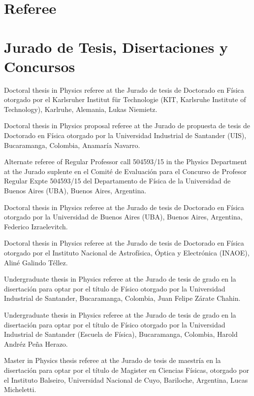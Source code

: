 

\ifeng
  \section*{Referee}
\else
  \section*{Jurado de Tesis, Disertaciones y Concursos}
\fi

\ifeng
Doctoral thesis in Physics referee at the 
\else
Jurado de tesis de Doctorado en Física otorgado por el 
\fi
Karlsruher Institut für Technologie (KIT, Karlsruhe Institute of Technology), Karlruhe, Alemania, Lukas Niemietz. 

\ifeng
Doctoral thesis in Physics proposal referee at the 
\else
Jurado de propuesta de tesis de Doctorado en Física otorgado por la 
\fi
Universidad Industrial de Santander (UIS), Bucaramanga, Colombia, Anamaría Navarro.

\ifeng
Alternate referee of Regular Professor call 504593/15 in the Physics Department at the  
\else
Jurado suplente en el Comité de Evaluación para el Concurso de Profesor Regular Expte 504593/15 del Departamento de Física de la 
\fi
Universidad de Buenos Aires (UBA), Buenos Aires, Argentina.

\ifeng
Doctoral thesis in Physics referee at the 
\else
Jurado de tesis de Doctorado en Física otorgado por la 
\fi
Universidad de Buenos Aires (UBA), Buenos Aires, Argentina, Federico Izraelevitch.

\ifeng
Doctoral thesis in Physics referee at the 
\else
Jurado de tesis de Doctorado en Física otorgado por el 
\fi
Instituto Nacional de Astrofísica, Óptica y Electrónica (INAOE), Aliné Galindo Téllez.

\ifeng
Undergraduate thesis in Physics referee at the  
\else
Jurado de tesis de grado en la disertación para optar por el título de Físico otorgado por la 
\fi
Universidad Industrial de Santander, Bucaramanga, Colombia, Juan Felipe Zárate Chahin.

\ifeng
Undergraduate thesis in Physics referee at the  
\else
Jurado de tesis de grado en la disertación para optar por el título de Físico otorgado por la 
\fi
Universidad Industrial de Santander (Escuela de Física), Bucaramanga, Colombia, Harold Andréz Peña Herazo.

\ifeng
Master in Physics thesis referee at the
\else
Jurado de tesis de maestría en la disertación para optar por el título de Magister en Ciencias Físicas, otorgado por el 
\fi
Instituto Balseiro, Universidad Nacional de Cuyo, Bariloche, Argentina, Lucas Micheletti.

